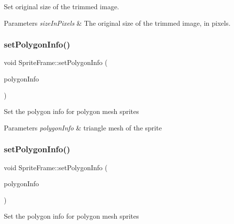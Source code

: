 Set original size of the trimmed image.


\begin{DoxyParams}{Parameters}
{\em size\+In\+Pixels} & The original size of the trimmed image, in pixels. \\
\hline
\end{DoxyParams}
\mbox{\label{classSpriteFrame_ab4bf60eb887f7080959952e8e33f23c2}} 
\subsubsection{\texorpdfstring{set\+Polygon\+Info()}{setPolygonInfo()}\hspace{0.1cm}{\footnotesize\ttfamily [1/2]}}
{\footnotesize\ttfamily void Sprite\+Frame\+::set\+Polygon\+Info (\begin{DoxyParamCaption}\item[{const \hyperlink{classPolygonInfo}{Polygon\+Info} \&}]{polygon\+Info }\end{DoxyParamCaption})}

Set the polygon info for polygon mesh sprites


\begin{DoxyParams}{Parameters}
{\em polygon\+Info} & triangle mesh of the sprite \\
\hline
\end{DoxyParams}
\mbox{\label{classSpriteFrame_ab4bf60eb887f7080959952e8e33f23c2}} 
\subsubsection{\texorpdfstring{set\+Polygon\+Info()}{setPolygonInfo()}\hspace{0.1cm}{\footnotesize\ttfamily [2/2]}}
{\footnotesize\ttfamily void Sprite\+Frame\+::set\+Polygon\+Info (\begin{DoxyParamCaption}\item[{const \hyperlink{classPolygonInfo}{Polygon\+Info} \&}]{polygon\+Info }\end{DoxyParamCaption})}

Set the polygon info for polygon mesh sprites


